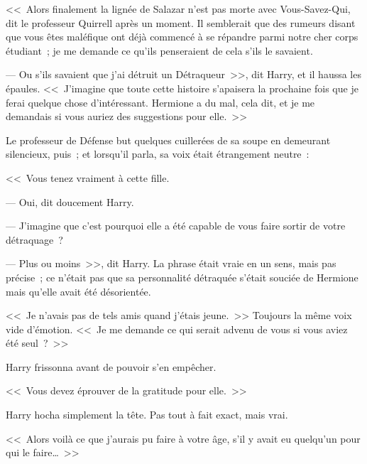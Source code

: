 <<~Alors finalement la lignée de Salazar n'est pas morte avec Vous-Savez-Qui, dit le professeur Quirrell après un moment. Il semblerait que des rumeurs disant que vous êtes maléfique ont déjà commencé à se répandre parmi notre cher corps étudiant~; je me demande ce qu'ils penseraient de cela s'ils le savaient.

--- Ou s'ils savaient que j'ai détruit un Détraqueur~>>, dit Harry, et il haussa les épaules. <<~J'imagine que toute cette histoire s'apaisera la prochaine fois que je ferai quelque chose d'intéressant. Hermione a du mal, cela dit, et je me demandais si vous auriez des suggestions pour elle.~>>

Le professeur de Défense but quelques cuillerées de sa soupe en demeurant silencieux, puis~; et lorsqu'il parla, sa voix était étrangement neutre~:

<<~Vous tenez vraiment à cette fille.

--- Oui, dit doucement Harry.

--- J'imagine que c'est pourquoi elle a été capable de vous faire sortir de votre détraquage~?

--- Plus ou moins~>>, dit Harry. La phrase était vraie en un sens, mais pas précise~; ce n'était pas que sa personnalité détraquée s'était souciée de Hermione mais qu'elle avait été désorientée.

<<~Je n'avais pas de tels amis quand j'étais jeune.~>> Toujours la même voix vide d'émotion. <<~Je me demande ce qui serait advenu de vous si vous aviez été seul~?~>>

Harry frissonna avant de pouvoir s'en empêcher.

<<~Vous devez éprouver de la gratitude pour elle.~>>

Harry hocha simplement la tête. Pas tout à fait exact, mais vrai.

<<~Alors voilà ce que j'aurais pu faire à votre âge, s'il y avait eu quelqu'un pour qui le faire…~>>
